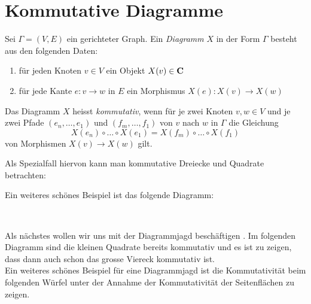 \documentclass{article}
\begin{document}
	\section{Kommutative Diagramme}
		\begin{defi}
		 \cite[Definition 2.4.3]{Bra}
		Sei \( \Gamma =(V,E) \) ein gerichteter Graph. Ein  \emph{Diagramm} $X$ in der Form \( \Gamma \) besteht aus den folgenden Daten:
		\begin{enumerate}
			\item f\"ur jeden Knoten \( v \in V \) ein  Objekt \( X(v) \in \mathbf{C} \)
			\item f\"ur jede Kante \( e:v \to w \) in \( E \) ein Morphismus \( X(e):X(v) \to X(w) \)  
		\end{enumerate}
		Das Diagramm $X$ heisst \emph{kommutativ}, wenn f\"ur je zwei Knoten \(v,w \in V \) und je zwei Pfade \( \left(e_n, \dots ,e_1\right) \) und \( \left(f_m, \dots ,f_1\right) \) von $v $ nach $w$ in $\Gamma $ die Gleichung 
		\[
			X(e_n) \circ \dots \circ X(e_1) = X(f_m) \circ \dots \circ X(f_1)
		\]
		von Morphismen \( X(v) \to X(w) \) gilt.
		
		Als Spezialfall hiervon kann man kommutative Dreiecke und Quadrate betrachten:\\
 		 
			
		\end{defi}
			 
		\newpage
		
		Ein weiteres sch\"ones Beispiel ist das folgende Diagramm:
		\begin{bsp} \\
		
		\end{bsp}
		
		Als n\"achstes wollen wir uns mit der Diagrammjagd besch\"aftigen \cite[Beispiel 2.4.7]{Bra}.
		Im folgenden Diagramm sind die kleinen Quadrate bereits kommutativ und es ist zu zeigen, dass dann auch schon das grosse Viereck kommutativ ist. \\
		
		\newpage
		Ein weiteres sch\"ones Beispiel f\"ur eine Diagrammjagd ist  die Kommutativit\"at beim folgenden W\"urfel \cite[Quellcode]{tikzcd} unter der Annahme der Kommutativit\"at der Seitenfl\"achen zu zeigen. \\
		
\end{document}
